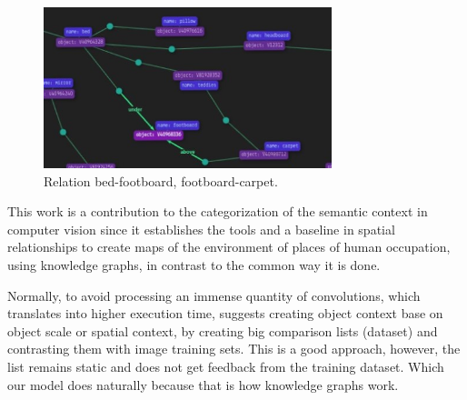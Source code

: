 \begin{figure}[H]
    \centering
    \includegraphics[width=8.4cm]{figures/realcionGrafo.jpeg}
    \caption{Relation bed-footboard, footboard-carpet.}
    \label{fig:ReGra}
\end{figure}

This work is a contribution to the categorization of the semantic context in computer vision since it establishes the tools and a baseline in spatial relationships to create maps of the environment of places of human occupation, using knowledge graphs, in contrast to the common way it is done.

Normally, to avoid processing an immense quantity of convolutions, which translates into higher execution time, \cite{Galleguillos} suggests creating object context base on object scale or spatial context, by creating big comparison lists (dataset) and contrasting them with image training sets. This is a good approach, however, the list remains static and does not get feedback from the training dataset. Which our model does naturally because that is how knowledge graphs work.